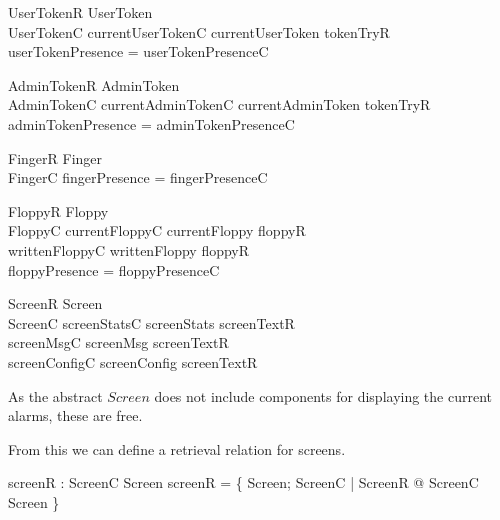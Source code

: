 \begin{schema}{UserTokenR}
        UserToken
\\      UserTokenC
\where
	currentUserTokenC \mapsto currentUserToken \in tokenTryR 
\\	userTokenPresence = userTokenPresenceC 
\end{schema}

\begin{schema}{AdminTokenR}
        AdminToken
\\      AdminTokenC
\where
	 currentAdminTokenC \mapsto currentAdminToken \in tokenTryR
\\	adminTokenPresence = adminTokenPresenceC 
\end{schema}

\begin{schema}{FingerR}
        Finger
\\      FingerC
\where
        fingerPresence = fingerPresenceC
\end{schema}


\begin{schema}{FloppyR}
        Floppy
\\      FloppyC
\where
       	currentFloppyC \mapsto currentFloppy \in floppyR
\\      writtenFloppyC \mapsto writtenFloppy \in floppyR 
\\	floppyPresence = floppyPresenceC
\end{schema}

\begin{schema}{ScreenR}
        Screen
\\      ScreenC
\where
        screenStatsC \mapsto screenStats \in screenTextR 
\\      screenMsgC \mapsto screenMsg \in screenTextR 
\\      screenConfigC \mapsto screenConfig \in screenTextR
\end{schema}
\begin{Zcomment}
\item
As the abstract $Screen$ does not include components for displaying
the current alarms, these are free.
\end{Zcomment}

From this we can define a retrieval relation for screens.

\begin{axdef}
        screenR : ScreenC \rel Screen
\where
        screenR = \{ Screen; ScreenC | ScreenR @ \theta ScreenC
        \mapsto \theta Screen \}
\end{axdef}


